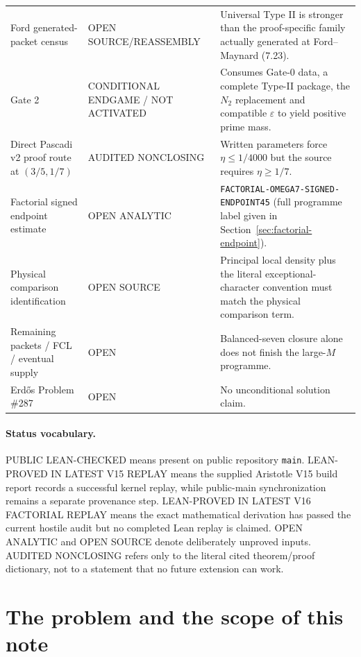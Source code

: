 \documentclass[11pt]{article}
\theoremstyle{definition}
\newcommand{\1}{\mathbf 1}
\newcommand{\status}[1]{\textsf{#1}}
\begin{document}
\begin{center}
\begin{tabularx}{\textwidth}{>{\raggedright\arraybackslash}p{}
>{\raggedright\arraybackslash}p{}X}
Ford generated-packet census & \status{OPEN SOURCE/REASSEMBLY} & Universal Type II is stronger than the proof-specific family actually generated at Ford--Maynard (7.23). \\
Gate 2 & \status{CONDITIONAL ENDGAME / NOT ACTIVATED} & Consumes Gate-0 data, a complete Type-II package, the $N_2$ replacement and compatible $\varepsilon$ to yield positive prime mass. \\
Direct Pascadi v2 proof route at $(3/5,1/7)$ & \status{AUDITED NONCLOSING} & Written parameters force $\eta\le1/4000$ but the source requires $\eta\ge1/7$. \\
Factorial signed endpoint estimate & \status{OPEN ANALYTIC} & \texttt{FACTORIAL-OMEGA7-SIGNED-ENDPOINT45} (full programme label given in Section~\ref{sec:factorial-endpoint}). \\
Physical comparison identification & \status{OPEN SOURCE} & Principal local density plus the literal exceptional-character convention must match the physical comparison term. \\
Remaining packets / FCL / eventual supply & \status{OPEN} & Balanced-seven closure alone does not finish the large-$M$ programme. \\
Erd\H{o}s Problem \#287 & \status{OPEN} & No unconditional solution claim. \\
\bottomrule
\end{tabularx}
\end{center}

\paragraph{Status vocabulary.}
\status{PUBLIC LEAN-CHECKED} means present on public repository \texttt{main}.
\status{LEAN-PROVED IN LATEST V15 REPLAY} means the supplied Aristotle V15 build report
records a successful kernel replay, while public-main synchronization remains a separate
provenance step.  \status{LEAN-PROVED IN LATEST V16 FACTORIAL REPLAY} means the exact mathematical
derivation has passed the current hostile audit but no completed Lean replay is claimed.
\status{OPEN ANALYTIC} and \status{OPEN SOURCE} denote deliberately unproved inputs.
\status{AUDITED NONCLOSING} refers only to the literal cited theorem/proof dictionary, not
to a statement that no future extension can work.

\tableofcontents

\section{The problem and the scope of this note}
\end{document}
